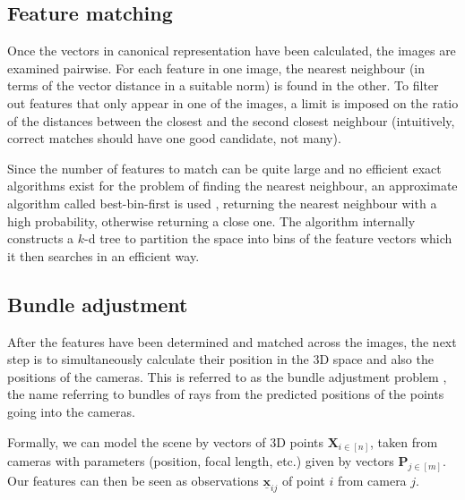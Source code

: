 \subsection{Feature matching}
Once the vectors in canonical representation have been calculated, the images are examined pairwise.
For each feature in one image, the nearest neighbour (in terms of the vector distance in a suitable norm) is found in the other.
To filter out features that only appear in one of the images, a limit is imposed on the ratio of the distances between the closest and the second closest neighbour (intuitively, correct matches should have one good candidate, not many).

Since the number of features to match can be quite large and no efficient exact algorithms exist for the problem of finding the nearest neighbour, an approximate algorithm called best-bin-first is used \cite{beis1997shape}, returning the nearest neighbour with a high probability, otherwise returning a close one.
The algorithm internally constructs a $k$-d tree to partition the space into bins of the feature vectors which it then searches in an efficient way.

\subsection{Bundle adjustment}
After the features have been determined and matched across the images, the next step is to simultaneously calculate their position in the 3D space and also the positions of the cameras.
This is referred to as the bundle adjustment problem \cite{snavely2008modeling,schneider19913}, the name referring to bundles of rays from the predicted positions of the points going into the cameras.

Formally, we can model the scene by vectors of 3D points $\mathbf{X}_{i \in [n]}$, taken from cameras with parameters (position, focal length, etc.) given by vectors $\mathbf{P}_{j \in [m]}$.
Our features can then be seen as observations $\underline{\bm{x}}_{ij}$ of point $i$ from camera $j$.

